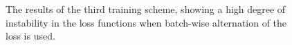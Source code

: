 \begin{figure}[p]
    \caption[The results of the third training scheme.]{The results of the third training scheme, showing a high degree of instability in the loss functions when batch-wise alternation of the loss is used.}
    \label{fig:training_scheme_3}
\end{figure}



